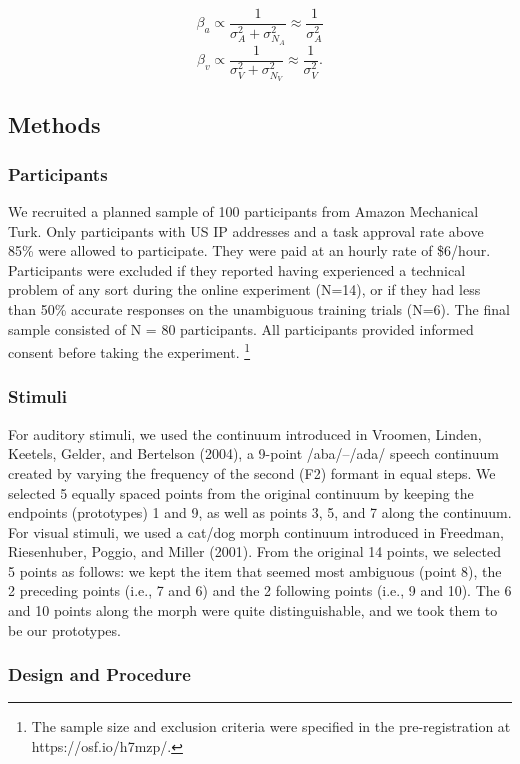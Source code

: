 \documentclass[english,floatsintext,man]{apa6}
\theoremstyle{definition}
\theoremstyle{definition}
\theoremstyle{definition}
\theoremstyle{remark}
\begin{document}
\[\beta_a \propto \frac{1}{\sigma^2_{A} + \sigma^2_{N_A}} \approx  \frac{1}{\sigma^2_{A} }\]
\[\beta_v \propto \frac{1}{\sigma^2_{V} + \sigma^2_{N_V}} \approx  \frac{1}{\sigma^2_{V} }.\]

\subsection{Methods}\label{methods}

\subsubsection{Participants}\label{participants}

We recruited a planned sample of 100 participants from Amazon Mechanical
Turk. Only participants with US IP addresses and a task approval rate
above 85\% were allowed to participate. They were paid at an hourly rate
of \$6/hour. Participants were excluded if they reported having
experienced a technical problem of any sort during the online experiment
(N=14), or if they had less than 50\% accurate responses on the
unambiguous training trials (N=6). The final sample consisted of N = 80
participants. All participants provided informed consent before taking
the experiment.
\footnote{The sample size and exclusion criteria were specified in the pre-registration at https://osf.io/h7mzp/.}

\subsubsection{Stimuli}\label{stimuli}

For auditory stimuli, we used the continuum introduced in Vroomen,
Linden, Keetels, Gelder, and Bertelson (2004), a 9-point /aba/--/ada/
speech continuum created by varying the frequency of the second (F2)
formant in equal steps. We selected 5 equally spaced points from the
original continuum by keeping the endpoints (prototypes) 1 and 9, as
well as points 3, 5, and 7 along the continuum. For visual stimuli, we
used a cat/dog morph continuum introduced in Freedman, Riesenhuber,
Poggio, and Miller (2001). From the original 14 points, we selected 5
points as follows: we kept the item that seemed most ambiguous (point
8), the 2 preceding points (i.e., 7 and 6) and the 2 following points
(i.e., 9 and 10). The 6 and 10 points along the morph were quite
distinguishable, and we took them to be our prototypes.

\subsubsection{Design and Procedure}\label{design-and-procedure}
\end{document}

